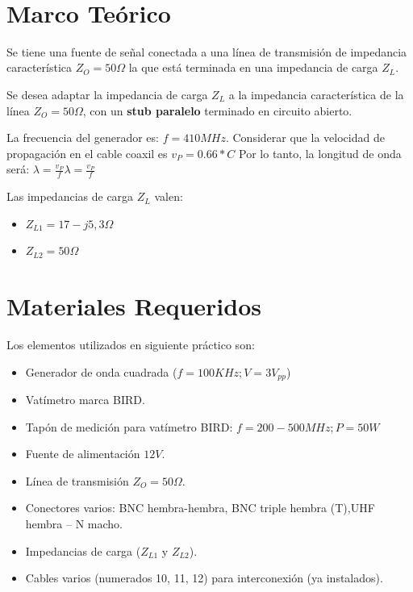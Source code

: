 \documentclass[12pt]{article}
\makeatletter
\let\thedate\@date
\makeatother
\begin{document}
\begin{titlepage}
	{\large \thedate}\\[2 cm]
 
	\vfill
	
\end{titlepage}


\tableofcontents
\pagebreak

\section{Marco Te\'orico}
Se tiene una fuente de señal conectada a una línea de transmisión de impedancia característica $Z_O = 50 \Omega$
la que está terminada en una impedancia de carga $Z_L$.

Se desea adaptar la impedancia de carga $Z_L$ a la impedancia característica de la línea $Z_O = 50 \Omega$, con un
\textbf{stub paralelo} terminado en circuito abierto.

La frecuencia del generador es: $f = 410 MHz.$
Considerar que la velocidad de propagación en el cable coaxil es $v_P = 0.66*C$ Por lo tanto, la longitud de onda será:
$\lambda = \frac{v_P}{f}\lambda = \frac{v_P}{f}$

Las impedancias de carga $Z_L$ valen:
\begin{itemize}
 \item $Z_{L1} = 17 - j 5,3 \Omega$
 \item $Z_{L2} = 50 \Omega$
\end{itemize}

\section{Materiales Requeridos}
Los elementos utilizados en siguiente práctico son:
\begin{itemize}

 \item Generador de onda cuadrada ($f = 100 KHz; V= 3 V_{pp}$) 
 \item Vatímetro marca BIRD.
 \item Tapón de medición para vatímetro BIRD: $f = 200-500 MHz; P = 50 W$
 \item Fuente de alimentación $12 V$.
 \item Línea de transmisión $Z_O = 50 \Omega$.
 \item Conectores varios: BNC hembra-hembra, BNC triple hembra (T),UHF hembra – N macho.
 \item Impedancias de carga ($Z_{L1}$  y $Z_{L2}$).
 \item Cables varios (numerados 10, 11, 12) para interconexión (ya instalados).
\end{itemize}
\end{document}
